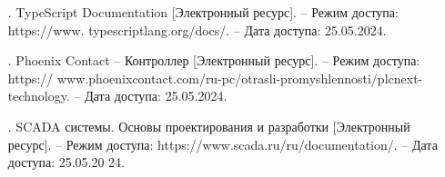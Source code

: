 {\begin{itemize}[leftmargin=2.15cm, labelwidth=0.65cm, labelsep=0.0cm]
\item[\theimagecntr.] TypeScript Documentation [Электронный ресурс]. – Режим доступа: https://www. typescriptlang.org/docs/. – Дата доступа: 25.05.2024.
\addtocounter{imagecntr}{1}

\item[\theimagecntr.] Phoenix Contact – Контроллер [Электронный ресурс]. – Режим доступа: https:// www.phoenixcontact.com/ru-pc/otrasli-promyshlennosti/plcnext-technology. – Дата доступа: 25.05.2024.
\addtocounter{imagecntr}{1}

\item[\theimagecntr.] SCADA системы. Основы проектирования и разработки [Электронный ресурс]. – Режим доступа: https://www.scada.ru/ru/documentation/. – Дата доступа: 25.05.20 24.
\addtocounter{imagecntr}{1}

\end{itemize}

}

